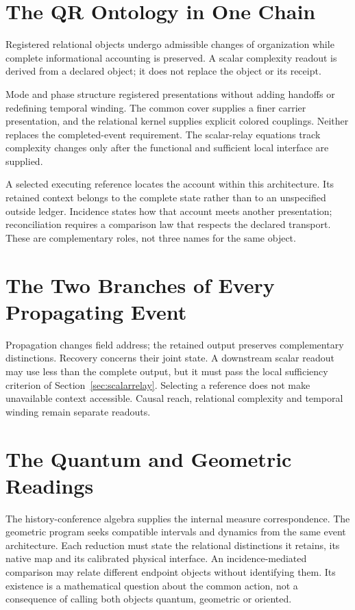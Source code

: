 \section{The QR Ontology in One Chain}\label{sec:synthesis}
Registered relational objects undergo admissible changes of organization while complete informational accounting is preserved. A scalar complexity readout is derived from a declared object; it does not replace the object or its receipt.

Mode and phase structure registered presentations without adding handoffs or redefining temporal winding. The common cover supplies a finer carrier presentation, and the relational kernel supplies explicit colored couplings. Neither replaces the completed-event requirement. The scalar-relay equations track complexity changes only after the functional and sufficient local interface are supplied.

A selected executing reference locates the account within this architecture. Its retained context belongs to the complete state rather than to an unspecified outside ledger. Incidence states how that account meets another presentation; reconciliation requires a comparison law that respects the declared transport. These are complementary roles, not three names for the same object.

\section{The Two Branches of Every Propagating Event}
Propagation changes field address; the retained output preserves complementary distinctions. Recovery concerns their joint state. A downstream scalar readout may use less than the complete output, but it must pass the local sufficiency criterion of Section~\ref{sec:scalarrelay}. Selecting a reference does not make unavailable context accessible. Causal reach, relational complexity and temporal winding remain separate readouts.

\section{The Quantum and Geometric Readings}
The history-conference algebra supplies the internal measure correspondence. The geometric program seeks compatible intervals and dynamics from the same event architecture. Each reduction must state the relational distinctions it retains, its native map and its calibrated physical interface. An incidence-mediated comparison may relate different endpoint objects without identifying them. Its existence is a mathematical question about the common action, not a consequence of calling both objects quantum, geometric or oriented.

